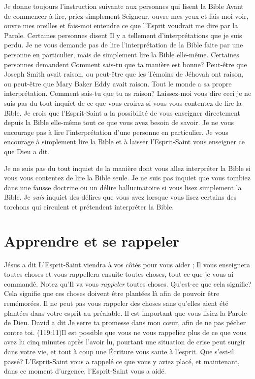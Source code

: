 Je donne toujours l'instruction suivante aux personnes qui lisent la Bible\frcolon{}
 \Og Avant de commencer à lire, priez simplement\frcolon{}
 \Og Seigneur, ouvre mes yeux et fais-moi voir,
 ouvre mes oreilles et fais-moi entendre ce que l'Esprit
 voudrait me dire par la Parole. \Fg{}
 Certaines personnes disent\frcolon{}
 \Og Il y a tellement d'in\-ter\-pré\-ta\-tions que je suis perdu. \Fg{}
 Je ne vous demande pas de lire l'interprétation de la Bible
 faite par une personne en particulier, mais de simplement lire la Bible
 elle-même. Certaines personnes demandent\frcolon{}
 \Og Comment sais-tu que ta manière est bonne? Peut-être que Joseph Smith
 avait raison, ou peut-être que les Témoins de Jéhovah ont raison,
 ou peut-être que Mary Baker Eddy avait raison.
 Tout le monde a sa propre interprétation.
 Comment sais-tu que tu as raison? \Fg{}
 Laissez-moi vous dire ceci\frcolon{} je ne suis pas du tout inquiet
 de ce que vous croirez si vous vous contentez de lire la Bible.
 Je crois que l'Esprit-Saint a la possibilité de vous enseigner
 \ocadr directement depuis la Bible elle-même \fcadr{}
 tout ce que vous avez besoin de savoir.
 Je ne vous encourage pas à lire l'interprétation d'une personne
 en particulier. Je vous encourage à simplement lire la Bible
 et à laisser l'Esprit-Saint vous enseigner ce que Dieu a dit.

Je ne suis pas du tout inquiet de la manière dont vous allez interpréter
 la Bible si vous vous contentez de lire la Bible seule.
 Je ne suis pas inquiet que vous tombiez dans une fausse doctrine
 ou un délire hallucinatoire si vous lisez simplement la Bible.
 Je \emph{suis} inquiet des délires que vous avez lorsque vous lisez certains
 des torchons qui circulent et prétendent interpréter la Bible.


\section{Apprendre et se rappeler}

Jésus a dit\frcolon{} \Og L'Esprit-Saint viendra à vos côtés pour vous aider ;
 Il vous enseignera toutes choses et vous rappellera ensuite toutes choses,
 tout ce que je vous ai commandé. \Fg{}
 Notez qu'Il va vous \emph{rappeler} toutes choses.
 Qu'est-ce que cela signifie? Cela signifie que ces choses
 doivent être plantées là afin de pouvoir être remémorées.
 Il ne peut pas vous rappeler des choses sans qu'elles aient été plantées
 dans votre esprit au préalable. Il est important que vous lisiez
 la Parole de Dieu. David a dit\frcolon{} \Og Je serre ta promesse dans mon cœur,
 afin de ne pas pécher contre toi. \Fg{}
 (119:11)Il est possible que vous ne vous rappeliez
 plus de ce que vous avez lu
 cinq minutes après l'avoir lu, pourtant une situation de crise
 peut surgir dans votre vie, et tout à coup une Écriture vous saute
 à l'esprit. Que s'est-il passé? L'Esprit-Saint vous a rappelé
 ce que vous y aviez placé, et maintenant, dans ce moment d'urgence,
 l'Esprit-Saint vous a aidé.

